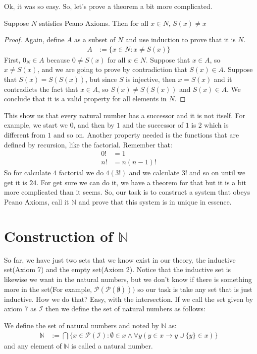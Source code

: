 \documentclass{tufte-handout}
\begin{document}
Ok, it was so easy. So, let's prove a theorem a bit more complicated.
\begin{theorem}
	Suppose $N$ satisfies Peano Axioms. Then for all $x \in N$, $S(x) \neq x$
\end{theorem}
\begin{proof}
	Again, define $A$ as a subset of $N$ and use induction to prove that it is $N$.
	\begin{align*}
		A &:= \{x \in N: x \neq S(x)\}
	\end{align*}
	First, $0_N \in A$ because $0 \neq S(x)$ for all $x \in N$. Suppose that $x \in A$, so $x \neq S(x)$, and we are going to prove by contradiction that $S(x) \in A$. Suppose that $S(x) = S(S(x))$, but since $S$ is injective, then $x = S(x)$ and it contradicts the fact that $x \in A$, so $S(x) \neq S(S(x))$ and $S(x) \in A$. We conclude that it is a valid property for all elements in $N$.
\end{proof}

This show us that every natural number has a successor and it is not itself. For example, we start we $0$, and then by $1$ and the successor of $1$ is $2$ which is different from $1$ and so on. Another property needed is the functions that are defined by recursion, like the factorial. Remember that:
\begin{align*}
	0! &= 1\\
	n! &= n(n-1)!
\end{align*}
So for calculate $4$ factorial we do $4(3!)$ and we calculate $3!$ and so on until we get it is $24$. For get sure we can do it, we have a theorem for that but it is a bit more complicated than it seems. So, our task is to construct a system that obeys Peano Axioms, call it $\mathbb{N}$ and prove that this system is in unique in essence.

\section{Construction of $\mathbb{N}$}
So far, we have just two sets that we know exist in our theory, the inductive set(Axiom 7) and the empty set(Axiom 2). Notice that the inductive set is likewise we want in the natural numbers, but we don't know if there is something more in the set(For example, $\mathcal{P}(\mathcal{P}(\emptyset)))$ so our task is take any set that is just inductive. How we do that? Easy, with the intersection. If we call the set given by axiom 7 as $\mathcal{I}$ then we define the set of natural numbers as follows:
\begin{definition}
	We define the set of natural numbers and noted by $\mathbb{N}$ as:
	\begin{align*}
		\mathbb{N} &:= \bigcap \{x \in \mathcal{P}(\mathcal{I}): \emptyset \in x \wedge \forall y(y \in x \rightarrow y \cup \{y\} \in x)\}
	\end{align*}
	and any element of $\mathbb{N}$ is called a natural number.
\end{definition}
\end{document}
